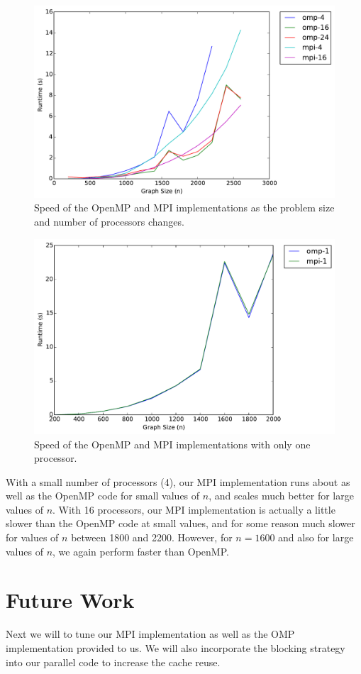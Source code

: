 \documentclass[11pt]{article}
\begin{document}
\begin{figure}[h]
	\centering
	\includegraphics[width=.8\textwidth]{mpi_omp_comparison.pdf}
	\caption{Speed of the OpenMP and MPI implementations as the problem size and number of processors changes.}
	\label{fig:mpi-omp}
\end{figure}

\begin{figure}[h]
	\centering
	\includegraphics[width=.8\textwidth]{serial.pdf}
	\caption{Speed of the OpenMP and MPI implementations with only one processor.}
	\label{fig:serial}
\end{figure}

With a small number of processors (4), our MPI implementation runs about as well as the OpenMP code for small values of $n$, and scales much better for large values of $n$.
With 16 processors, our MPI implementation is actually a little slower than the OpenMP code at small values, and for some reason much slower for values of $n$ between 1800 and 2200.
However, for $n = 1600$ and also for large values of $n$, we again perform faster than OpenMP.


\section{Future Work}
Next we will to tune our MPI implementation as well as the OMP implementation provided to us. We will also incorporate the blocking strategy into our parallel code to increase the cache reuse.
\end{document}
